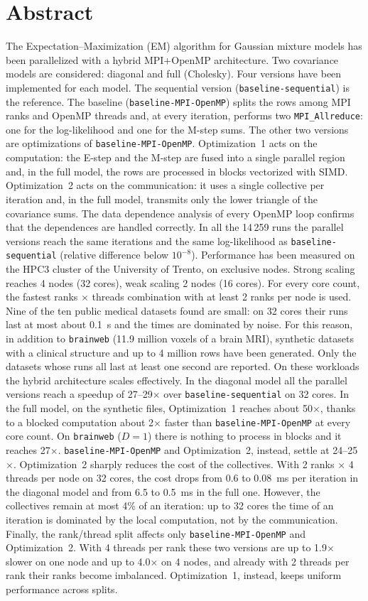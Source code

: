 \documentclass[conference,onecolumn]{IEEEtran}
\newcommand{\vseq}{\texttt{baseline-\allowbreak sequential}}
\newcommand{\vbase}{\texttt{baseline-\allowbreak MPI-\allowbreak OpenMP}}
\begin{document}
\section*{Abstract}
\begin{sloppypar}
The Expectation--Maximization (EM) algorithm for Gaussian mixture models has been parallelized with a hybrid MPI+OpenMP architecture. Two covariance models are considered: diagonal and full (Cholesky). Four versions have been implemented for each model. The sequential version (\vseq{}) is the reference. The baseline (\vbase{}) splits the rows among MPI ranks and OpenMP threads and, at every iteration, performs two \texttt{MPI\_Allreduce}: one for the log-likelihood and one for the M-step sums. The other two versions are optimizations of \vbase{}. Optimization~1 acts on the computation: the E-step and the M-step are fused into a single parallel region and, in the full model, the rows are processed in blocks vectorized with SIMD. Optimization~2 acts on the communication: it uses a single collective per iteration and, in the full model, transmits only the lower triangle of the covariance sums. The data dependence analysis of every OpenMP loop confirms that the dependences are handled correctly. In all the 14\,259 runs the parallel versions reach the same iterations and the same log-likelihood as \vseq{} (relative difference below $10^{-8}$). Performance has been measured on the HPC3 cluster of the University of Trento, on exclusive nodes. Strong scaling reaches 4 nodes (32 cores), weak scaling 2 nodes (16 cores). For every core count, the fastest ranks $\times$ threads combination with at least 2 ranks per node is used. Nine of the ten public medical datasets found are small: on 32 cores their runs last at most about 0.1~s and the times are dominated by noise. For this reason, in addition to \texttt{brainweb} (11.9 million voxels of a brain MRI), synthetic datasets with a clinical structure and up to 4 million rows have been generated. Only the datasets whose runs all last at least one second are reported. On these workloads the hybrid architecture scales effectively. In the diagonal model all the parallel versions reach a speedup of 27--29$\times$ over \vseq{} on 32 cores. In the full model, on the synthetic files, Optimization~1 reaches about 50$\times$, thanks to a blocked computation about 2$\times$ faster than \vbase{} at every core count. On \texttt{brainweb} ($D=1$) there is nothing to process in blocks and it reaches 27$\times$. \vbase{} and Optimization~2, instead, settle at 24--25$\times$. Optimization~2 sharply reduces the cost of the collectives. With 2 ranks $\times$ 4 threads per node on 32 cores, the cost drops from 0.6 to 0.08~ms per iteration in the diagonal model and from 6.5 to 0.5~ms in the full one. However, the collectives remain at most 4\% of an iteration: up to 32 cores the time of an iteration is dominated by the local computation, not by the communication. Finally, the rank/thread split affects only \vbase{} and Optimization~2. With 4 threads per rank these two versions are up to 1.9$\times$ slower on one node and up to 4.0$\times$ on 4 nodes, and already with 2 threads per rank their ranks become imbalanced. Optimization~1, instead, keeps uniform performance across splits.
\end{sloppypar}
\end{document}
